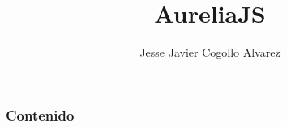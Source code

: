 \documentclass{beamer}
\title[AureliaJS]{AureliaJS}
\author{Jesse Javier Cogollo Alvarez}
\institute[EAFIT - TalosDigital]
{
Developer by passion \\
\medskip
\textit{email: cogollo87@gmail.com} \\~\\
\textit{MedellinJS}
}
\begin{document}
\begin{frame}
\titlepage %
\end{frame}

\begin{frame}
\frametitle{Contenido} %
\tableofcontents %
\end{frame}


\end{document}
